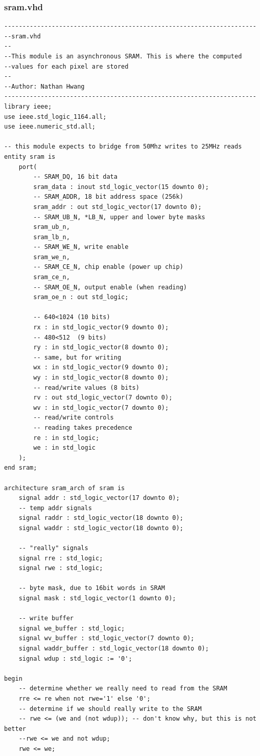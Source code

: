 \documentclass{article}
\begin{document}
\subsubsection{sram.vhd}							%
\begin{lstlisting}
---------------------------------------------------------------------
--sram.vhd
--
--This module is an asynchronous SRAM. This is where the computed
--values for each pixel are stored
--
--Author: Nathan Hwang
---------------------------------------------------------------------
library ieee;
use ieee.std_logic_1164.all;
use ieee.numeric_std.all;

-- this module expects to bridge from 50Mhz writes to 25MHz reads
entity sram is
	port(
		-- SRAM_DQ, 16 bit data
		sram_data : inout std_logic_vector(15 downto 0);
		-- SRAM_ADDR, 18 bit address space (256k)
		sram_addr : out std_logic_vector(17 downto 0);
		-- SRAM_UB_N, *LB_N, upper and lower byte masks
		sram_ub_n,
		sram_lb_n,
		-- SRAM_WE_N, write enable
		sram_we_n,
		-- SRAM_CE_N, chip enable (power up chip)
		sram_ce_n,
		-- SRAM_OE_N, output enable (when reading)
		sram_oe_n : out std_logic;
	
		-- 640<1024 (10 bits)
		rx : in std_logic_vector(9 downto 0);
		-- 480<512  (9 bits)
		ry : in std_logic_vector(8 downto 0);
		-- same, but for writing
		wx : in std_logic_vector(9 downto 0);
		wy : in std_logic_vector(8 downto 0);
		-- read/write values (8 bits)
		rv : out std_logic_vector(7 downto 0);
		wv : in std_logic_vector(7 downto 0);
		-- read/write controls
		-- reading takes precedence
		re : in std_logic;
		we : in std_logic
	);
end sram;

architecture sram_arch of sram is
	signal addr : std_logic_vector(17 downto 0);
	-- temp addr signals
	signal raddr : std_logic_vector(18 downto 0);
	signal waddr : std_logic_vector(18 downto 0);

	-- "really" signals
	signal rre : std_logic;
	signal rwe : std_logic;

	-- byte mask, due to 16bit words in SRAM
	signal mask : std_logic_vector(1 downto 0);

	-- write buffer
	signal we_buffer : std_logic;
	signal wv_buffer : std_logic_vector(7 downto 0);
	signal waddr_buffer : std_logic_vector(18 downto 0);
	signal wdup : std_logic := '0';

begin
	-- determine whether we really need to read from the SRAM
	rre <= re when not rwe='1' else '0';
	-- determine if we should really write to the SRAM
	-- rwe <= (we and (not wdup)); -- don't know why, but this is not better
	--rwe <= we and not wdup;
	rwe <= we;


\end{lstlisting}
\end{document}
